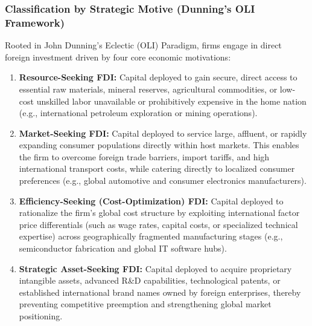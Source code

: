 \subsubsection{Classification by Strategic Motive (Dunning's OLI Framework)}
Rooted in John Dunning's Eclectic (OLI) Paradigm, firms engage in direct foreign investment driven by four core economic motivations:
\begin{enumerate}[leftmargin=1.8em, label=\textbf{\arabic*.}]
    \item \textbf{Resource-Seeking FDI:} Capital deployed to gain secure, direct access to essential raw materials, mineral reserves, agricultural commodities, or low-cost unskilled labor unavailable or prohibitively expensive in the home nation (e.g., international petroleum exploration or mining operations).
    \item \textbf{Market-Seeking FDI:} Capital deployed to service large, affluent, or rapidly expanding consumer populations directly within host markets. This enables the firm to overcome foreign trade barriers, import tariffs, and high international transport costs, while catering directly to localized consumer preferences (e.g., global automotive and consumer electronics manufacturers).
    \item \textbf{Efficiency-Seeking (Cost-Optimization) FDI:} Capital deployed to rationalize the firm's global cost structure by exploiting international factor price differentials (such as wage rates, capital costs, or specialized technical expertise) across geographically fragmented manufacturing stages (e.g., semiconductor fabrication and global IT software hubs).
    \item \textbf{Strategic Asset-Seeking FDI:} Capital deployed to acquire proprietary intangible assets, advanced R\&D capabilities, technological patents, or established international brand names owned by foreign enterprises, thereby preventing competitive preemption and strengthening global market positioning.
\end{enumerate}

